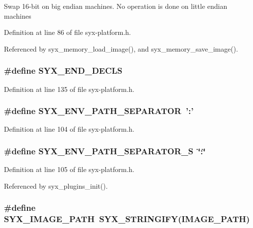 Swap 16-bit on big endian machines. No operation is done on little endian machines 

Definition at line 86 of file syx-platform.h.

Referenced by syx\_\-memory\_\-load\_\-image(), and syx\_\-memory\_\-save\_\-image().\hypertarget{syx-platform_8h_b49d39cb21f00cde506d2f96b695233d}{
\subsubsection{\setlength{\rightskip}{0pt plus 5cm}\#define SYX\_\-END\_\-DECLS}}
\label{syx-platform_8h_b49d39cb21f00cde506d2f96b695233d}




Definition at line 135 of file syx-platform.h.\hypertarget{syx-platform_8h_85733c8e1279536d1bbdb01e5e925c07}{
\subsubsection{\setlength{\rightskip}{0pt plus 5cm}\#define SYX\_\-ENV\_\-PATH\_\-SEPARATOR~':'}}
\label{syx-platform_8h_85733c8e1279536d1bbdb01e5e925c07}




Definition at line 104 of file syx-platform.h.\hypertarget{syx-platform_8h_8b36222964ed2c13f60f2170e3dd4bc6}{
\subsubsection{\setlength{\rightskip}{0pt plus 5cm}\#define SYX\_\-ENV\_\-PATH\_\-SEPARATOR\_\-S~\char`\"{}:\char`\"{}}}
\label{syx-platform_8h_8b36222964ed2c13f60f2170e3dd4bc6}




Definition at line 105 of file syx-platform.h.

Referenced by syx\_\-plugins\_\-init().\hypertarget{syx-platform_8h_96e7668db9abdb2c425fd399ddb6981f}{
\subsubsection{\setlength{\rightskip}{0pt plus 5cm}\#define SYX\_\-IMAGE\_\-PATH~SYX\_\-STRINGIFY(IMAGE\_\-PATH)}}
\label{syx-platform_8h_96e7668db9abdb2c425fd399ddb6981f}




